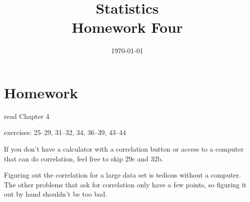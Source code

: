 \documentclass[letterpaper, landscape]{exam}
\title{Statistics \\ Homework Four}
\date{\today}
\author{}
\begin{document}
  \maketitle

  \section{Homework}
    \begin{itemize*}
      \item read Chapter 4 
      \item exercises: 25--29, 31--32, 34, 36--39, 43--44
    \end{itemize*}

    \ifprintanswers{}
  \else

    If you don't have a calculator with a correlation button or access to a
    computer that can do correlation, feel free to skip 29c and 32b.  
    
    Figuring out the correlation for a large data set is tedious without a
    computer.  The other problems that ask for correlation only have a few
    points, so figuring it out by hand shouldn't be too bad.

  \fi
\end{document}
